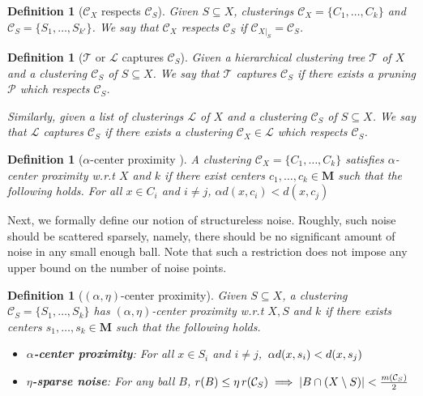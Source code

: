 \documentclass[12pt]{article}
\newtheorem{definition}[theorem]{Definition}
\newcommand{\mc}{\mathcal}
\newcommand{\mb}{\mathbf}
\begin{document}
\begin{definition}[$\mc C_{X}$ respects $\mc C_{S}$] Given $S \subseteq X$, clusterings $\mc C_{X} = \{C_1, \ldots, C_k\}$ and $\mc C_{S} = \{S_1, \ldots, S_{k'}\}$. We say that $\mc C_{X}$ respects $\mc C_{S}$ if $\mc C_{{X}|_{S}} = \mc C_{S}$.
\end{definition}

\begin{definition}[$\mc T$ or $\mc L$ captures $\mc C_{S}$]Given a hierarchical clustering tree $\mc T$ of $X$ and a clustering $\mc C_{S}$ of $S \subseteq X$.  We say that $\mc T$ captures $\mc C_{S}$ if there exists a pruning $\mc P$ which respects $\mc C_{S}$. 

Similarly, given a list of clusterings $\mc L$ of $X$ and a clustering $\mc C_{S}$ of $S \subseteq X$. We say that $\mc L$ captures $\mc C_{S}$ if there exists a clustering $\mc C_{X} \in \mc L$ which respects $\mc C_{S}$. 
\end{definition}

\begin{definition}[$\alpha$-center proximity \cite{awasthi2012center}]
\label{defn:alphacp}
A clustering $\mc C_{X} = \{C_1, \ldots, C_k\}$ satisfies $\alpha$-center proximity w.r.t $X$ and $k$ if there exist centers $c_1, \ldots, c_k \in \mb M$  such that the following holds. For all $x \in C_i$ and $i\neq j$, $\alpha d(x, c_i) < d(x, c_j)$
\end{definition}

Next, we formally define our notion of structureless noise. Roughly, such noise should be scattered sparsely, namely, there should be no significant amount of noise in any small enough ball. Note that such a restriction does not impose any upper bound on the number of noise points.

\begin{definition}[$(\alpha, \eta)$-center proximity]
\label{def:alphaeta}
Given $S \subseteq X$, a clustering $\mc C_{S} = \{S_1, \ldots, S_k\}$ has $(\alpha, \eta)$-center proximity w.r.t $X, S$ and $k$ if there exists centers $s_1, \ldots, s_k \in \mb M$  such that the following holds.
\begin{itemize}[nolistsep, noitemsep]
\label{defn:alphacpnoise}	

\item[$\diamond$] {\bf $\alpha$-center proximity}: For all $x \in S_i$ and $i\neq j$, $\thinspace\alpha d(x, s_i) < d(x, s_j)$
\item[$\diamond$]{\bf $\eta$-sparse noise}: For any ball $B$, $r(B)\leq \eta \thinspace r(\mc{C}_{S}) \implies |B\cap (X\setminus S)| < \frac{m(\mc C_{S})}{2}$
\end{itemize}
\end{definition}
\end{document}
